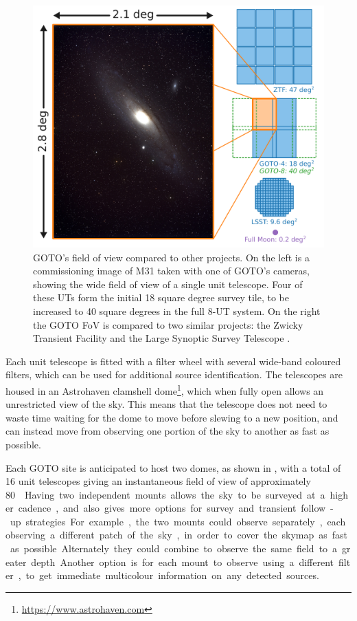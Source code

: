 \begin{colsection}
\begin{colsection}
\begin{figure}[p]
    \begin{center}
        \includegraphics[width=\linewidth]{images/fov.pdf}
    \end{center}
    \caption[GOTO's field of view compared to other projects]{
        GOTO's field of view compared to other projects. On the left is a commissioning image of M31 taken with one of GOTO's cameras, showing the wide field of view of a single unit telescope. Four of these UTs form the initial 18 square degree survey tile, to be increased to 40 square degrees in the full 8-UT system. On the right the GOTO FoV is compared to two similar projects: the Zwicky Transient Facility  \citep[ZTF,][]{ZTF} and the Large Synoptic Survey Telescope  \citep[LSST,][]{LSST}.
    }\label{fig:fov}
\end{figure}

Each unit telescope is fitted with a filter wheel with several wide-band coloured filters, which can be used for additional source identification. The telescopes are housed in an Astrohaven clamshell dome\footnote{\url{https://www.astrohaven.com}}, which when fully open allows an unrestricted view of the sky. This means that the telescope does not need to waste time waiting for the dome to move before slewing to a new position, and can instead move from observing one portion of the sky to another as fast as possible.

Each GOTO site is anticipated to host two domes, as shown in , with a total of 16 unit telescopes giving an instantaneous field of view of approximately \SI{80}{\square\deg}. Having two independent mounts allows the sky to be surveyed at a higher cadence, and also gives more options for survey and transient follow-up strategies. For example, the two mounts could observe separately, each observing a different patch of the sky, in order to cover the skymap as fast as possible. Alternately they could combine to observe the same field to a greater depth. Another option is for each mount to observe using a different filter, to get immediate multicolour information on any detected sources.



\end{colsection}
\end{colsection}
